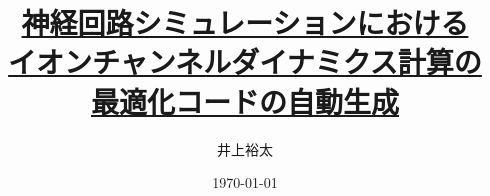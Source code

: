 \documentclass[a4j,12pt,onecolumn]{ujarticle} %
\title{\underline{神経回路シミュレーションにおける}\\\underline{イオンチャンネルダイナミクス計算の}\\\underline{最適化コードの自動生成}}
\date{\today}
\author{井上裕太}
\begin{document}
\maketitle %


\clearpage
\tableofcontents
\clearpage
\listoffigures
\clearpage
\listoftables

% 
\clearpage

\clearpage

\clearpage

\clearpage

\clearpage

\clearpage

\clearpage
\medskip


\end{document}
